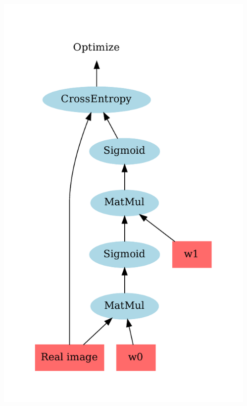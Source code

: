 \documentclass{Bredelebeamer}
\begin{document}
\begin{frame}
\begin{columns}
\begin{column}{0.5\textwidth}
	\includegraphics[width=\textwidth]{cross_entropy.pdf}
	\pause
\end{column}
\begin{column}{0.5\textwidth}  %

\end{column}
\end{columns}
\end{frame}
\end{document}

